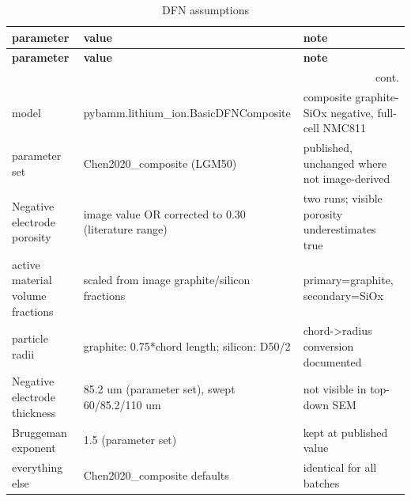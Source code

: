 \documentclass[11pt,a4paper]{article}
\begin{document}
\begin{longtable}{lp{5cm}p{5.5cm}}
\caption{DFN assumptions}\label{tab:dfnass}\\
\toprule
\textbf{parameter} & \textbf{value} & \textbf{note} \\
\midrule
\endfirsthead
\toprule \textbf{parameter} & \textbf{value} & \textbf{note} \\
\midrule
\endhead
\midrule\multicolumn{3}{r}{\footnotesize cont.}\\\midrule\endfoot
\bottomrule\endlastfoot
model & pybamm.lithium\_ion.BasicDFNComposite & composite graphite-SiOx negative, full-cell NMC811 \\
parameter set & Chen2020\_composite (LGM50) & published, unchanged where not image-derived \\
Negative electrode porosity & image value  OR corrected to 0.30 (literature range) & two runs; visible porosity underestimates true \\
active material volume fractions & scaled from image graphite/silicon fractions & primary=graphite, secondary=SiOx \\
particle radii & graphite: 0.75*chord length; silicon: D50/2 & chord->radius conversion documented \\
Negative electrode thickness & 85.2 um (parameter set), swept 60/85.2/110 um & not visible in top-down SEM \\
Bruggeman exponent & 1.5 (parameter set) & kept at published value \\
everything else & Chen2020\_composite defaults & identical for all batches \\
\end{longtable}
\normalsize
\scriptsize
\end{document}
